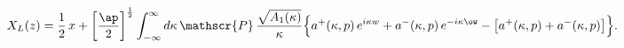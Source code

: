 \begin{equation*}
X_L(z)=
\frac{1}{2}\,x+\left[\frac{\ap}{2}\right]^{\frac12}
\int_{-\infty}^{\infty}d\kappa\,\mathscr{P}\,
\frac{\sqrt{A_1(\kappa)}}{\kappa}
\Bigl\{a^+(\kappa,p)\,e^{i\kappa w}+
a^-(\kappa,p)\,e^{-i\kappa \ow}
-\bigl[a^+(\kappa,p)+a^-(\kappa,p)\bigr]\Bigr\}.
\end{equation*}

